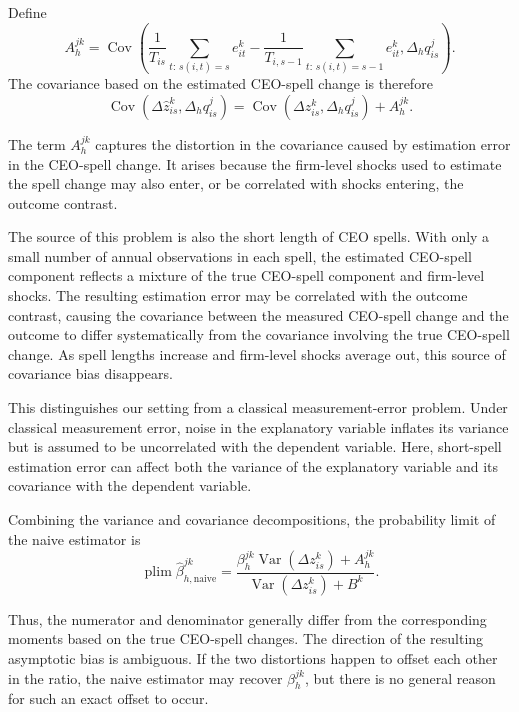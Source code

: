 \documentclass[11pt,a4paper]{article}
\begin{document}
Define
\begin{equation}
A_h^{jk}
=
\operatorname{Cov}\!\left(
\frac{1}{T_{is}}
\sum_{t:\,s(i,t)=s} e_{it}^{k}
-
\frac{1}{T_{i,s-1}}
\sum_{t:\,s(i,t)=s-1} e_{it}^{k},
\Delta_h q_{is}^{j}
\right).
\label{eq:A_definition}
\end{equation}
The covariance based on the estimated CEO-spell change is therefore
\begin{equation}
\operatorname{Cov}\!\left(
\Delta\widehat z_{is}^{k},
\Delta_h q_{is}^{j}
\right)
=
\operatorname{Cov}\!\left(
\Delta z_{is}^{k},
\Delta_h q_{is}^{j}
\right)
+
A_h^{jk}.
\label{eq:covariance_bias}
\end{equation}

The term $A_h^{jk}$ captures the distortion in the covariance caused
by estimation error in the CEO-spell change. It arises because the
firm-level shocks used to estimate the spell change may also enter, or
be correlated with shocks entering, the outcome contrast.

The source of this problem is also the short length of CEO spells. With only a small number of annual observations in each spell, the estimated CEO-spell component reflects a mixture of the true CEO-spell component and firm-level shocks. The resulting estimation error may be correlated with the outcome contrast, causing the covariance between the measured CEO-spell change and the outcome to differ systematically from the covariance involving the true CEO-spell change. As spell lengths increase and firm-level shocks average out, this source of covariance bias disappears.

This distinguishes our setting from a classical measurement-error
problem. Under classical measurement error, noise in the explanatory
variable inflates its variance but is assumed to be uncorrelated with
the dependent variable. Here, short-spell estimation error can affect
both the variance of the explanatory variable and its covariance with
the dependent variable.

Combining the variance and covariance decompositions, the probability
limit of the naive estimator is
\begin{equation}
\operatorname{plim}
\widehat\beta_{h,\mathrm{naive}}^{jk}
=
\frac{
\beta_h^{jk}
\operatorname{Var}\!\left(
\Delta z_{is}^{k}
\right)
+
A_h^{jk}
}{
\operatorname{Var}\!\left(
\Delta z_{is}^{k}
\right)
+
B^{k}
}.
\label{eq:naive_beta_plim}
\end{equation}

Thus, the numerator and denominator generally differ from the
corresponding moments based on the true CEO-spell changes. The
direction of the resulting asymptotic bias is ambiguous. If the two
distortions happen to offset each other in the ratio, the naive
estimator may recover $\beta_h^{jk}$, but there is no general reason
for such an exact offset to occur.
\end{document}
